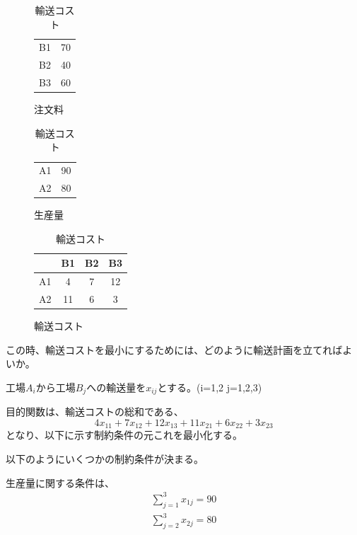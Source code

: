 \documentclass[9pt]{ltjsreport}
\begin{document}
\begin{table}[h]
    \centering
    \label{tab:transportation}
    \caption{輸送問題のデータ}
    \begin{subfigure}{0.3\columnwidth}
        \centering
        \caption[(a)]{注文料}
        \begin{tabular}{c|c}\toprule
            B1&70\\
            B2&40\\
            B3&60 \\ \bottomrule
        \end{tabular}
    \end{subfigure}
    \begin{subfigure}{0.3\columnwidth}
        \centering
        \caption[(b)]{生産量}
        \begin{tabular}{c|c}\toprule
            A1&90\\
            A2&80\\ \bottomrule
        \end{tabular}
    \end{subfigure}
    \begin{subfigure}{0.3\columnwidth}
        \centering
        \caption[(c)]{輸送コスト}
        \begin{tabular}{cccc}\toprule
            &B1&B2&B3\\ \midrule
            A1&4&7&12\\
            A2&11&6&3 \\ \bottomrule
        \end{tabular}
    \end{subfigure}
\end{table}



この時、輸送コストを最小にするためには、どのように輸送計画を立てればよいか。

\hrulefill

工場$A_i$から工場$B_j$への輸送量を$x_{ij}$とする。(i=1,2 j=1,2,3)

目的関数は、輸送コストの総和である、
\begin{equation}
    4x_{11}+7x_{12}+12x_{13}+11x_{21}+6x_{22}+3x_{23}
\end{equation}
となり、以下に示す制約条件の元これを最小化する。

以下のようにいくつかの制約条件が決まる。

生産量に関する条件は、
\begin{gather}
    \sum_{j=1}^3 x_{1j} = 90\\
    \sum_{j=2}^3 x_{2j} = 80
\end{gather}    
\end{document}
